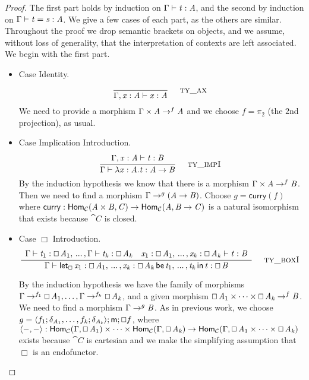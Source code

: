 \begin{proof}
  The first part holds by induction on $\Gamma  \vdash  \TLLnt{t}  \TLLsym{:}  \TLLnt{A}$, and the
  second by induction on $ \Gamma  \vdash  \TLLnt{t}  =  \TLLnt{s}  :  \TLLnt{A} $.  We give a few cases of each part, as the others are similar.  Throughout the proof we
  drop semantic brackets on objects, and we assume, without loss of
  generality, that the interpretation of contexts are left associated.
  We begin with the first part.

  \begin{itemize}
  \item[] Case Identity.\\
    \[
    \TLLdruletyXXax{}
    \]
    We need to provide a morphism $\Gamma \times \TLLnt{A} \mto^{f}
    \TLLnt{A}$ and we choose $f = \pi_2$ (the $2$nd projection), as usual.

    \item[] Case Implication Introduction.\\
    \[
    \TLLdruletyXXimpI{}
    \]
    By the induction hypothesis we know that there is a morphism
    $\Gamma \times \TLLnt{A} \mto^f \TLLnt{B}$.  Then we need  to find a
    morphism $\Gamma \mto^{g} (\TLLnt{A}  \to  \TLLnt{B})$.  Choose $g =
    \mathsf{curry}(f)$ where $\mathsf{curry} :
    \mathsf{Hom}_{\cat{C}}( \TLLnt{A}  \times  \TLLnt{B} ,\TLLnt{C}) \mto
    \mathsf{Hom}_{\cat{C}}(\TLLnt{A},\TLLnt{B}  \to  \TLLnt{C})$ is a natural isomorphism
    that exists because $\cat{C}$ is closed.

  \item[] Case $\Box$ Introduction.\\
    \[
    \TLLdruletyXXboxI{}
    \]

    By the induction hypothesis we have the family of morphisms $\Gamma
    \mto^{f_1} \Box \, \TLLnt{A_{{\mathrm{1}}}}, \ldots, \Gamma \mto^{f_k} \Box \, \TLLnt{A_{\TLLmv{k}}}$, and a given morphism
    $\Box \, \TLLnt{A_{{\mathrm{1}}}} \times \cdots \times \Box \, \TLLnt{A_{\TLLmv{k}}} \mto^f \TLLnt{B}$.  We need 
     to find a morphism $\Gamma \mto^{g} \TLLnt{B}$.  As in previous work, we choose $g =
    \langle f_1;\delta_{\TLLnt{A_{{\mathrm{1}}}}},\ldots,f_k;\delta_{\TLLnt{A_{\TLLmv{k}}}} \rangle;\mathsf{m};\Box f$, where $\langle -,-\rangle :
    \mathsf{Hom}_{\cat{C}}(\Gamma,\Box \, \TLLnt{A_{{\mathrm{1}}}}) \times \cdots \times
    \mathsf{Hom}_{\cat{C}}(\Gamma,\Box \, \TLLnt{A_{\TLLmv{k}}}) \mto \mathsf{Hom}_{\cat{C}}(\Gamma,\Box \, \TLLnt{A_{{\mathrm{1}}}}
    \times \cdots \times \Box \, \TLLnt{A_{\TLLmv{k}}})$ exists because $\cat{C}$ is cartesian and we make the simplifying assumption that $\Box$ is an endofunctor.


\end{itemize}
\end{proof}
